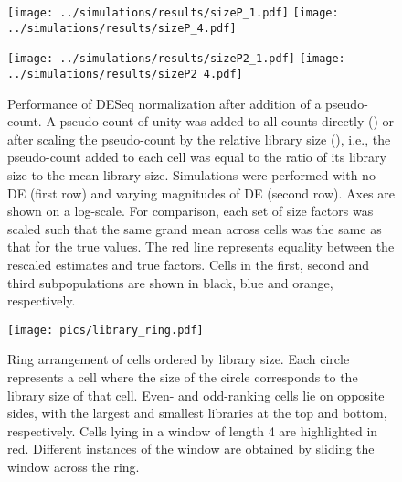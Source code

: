 \documentclass{article}
\begin{document}
\begin{figure}[p]
    \begin{center}
        \begin{minipage}{0.33\textwidth}
            \texttt{[image: ../simulations/results/sizeP\_1.pdf]}
            \texttt{[image: ../simulations/results/sizeP\_4.pdf]}
            \subcaption{}\label{subfig:size_prior}
        \end{minipage}
        \begin{minipage}{0.33\textwidth}
            \texttt{[image: ../simulations/results/sizeP2\_1.pdf]}
            \texttt{[image: ../simulations/results/sizeP2\_4.pdf]}
            \subcaption{}\label{subfig:size_libprior}
        \end{minipage}
    \end{center}
    \caption{
        Performance of DESeq normalization after addition of a pseudo-count.
        A pseudo-count of unity was added to all counts directly () or after scaling the pseudo-count by the relative library size (), i.e., the pseudo-count added to each cell was equal to the ratio of its library size to the mean library size.
        Simulations were performed with no DE (first row) and varying magnitudes of DE (second row).
        Axes are shown on a log-scale.
        For comparison, each set of size factors was scaled such that the same grand mean across cells was the same as that for the true values.
        The red line represents equality between the rescaled estimates and true factors.
        Cells in the first, second and third subpopulations are shown in black, blue and orange, respectively.
    }
\end{figure}

\begin{figure}[bt]
    \begin{center}
        \texttt{[image: pics/library\_ring.pdf]}
    \end{center}
    \caption{
        Ring arrangement of cells ordered by library size.
        Each circle represents a cell where the size of the circle corresponds to the library size of that cell.
        Even- and odd-ranking cells lie on opposite sides, with the largest and smallest libraries at the top and bottom, respectively.
        Cells lying in a window of length 4 are highlighted in red.
        Different instances of the window are obtained by sliding the window across the ring.
    }
    \label{fig:library_ring}
\end{figure}
\end{document}
